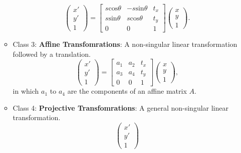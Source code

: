 \documentclass[twocolumn]{article}
\begin{document}
\begin{itemize}
\begin{itemize}
\begin{equation}
                \begin{pmatrix}
                    x' \\ y' \\ 1
                \end{pmatrix} =
                \begin{bmatrix}
                    s\text{cos} \theta  & - s\text{sin} \theta   & t_x \\
                    s\text{sin} \theta  & s\text{cos} \theta     & t_y \\
                    0                   & 0                     & 1
                \end{bmatrix}\begin{pmatrix}
                    x \\ y \\ 1
                \end{pmatrix}.
            \end{equation}
        \item Class 3: \textbf{Affine Transfomrations}: A non-singular linear transformation followed by a translation.
            \begin{equation}
                \begin{pmatrix}
                    x' \\ y' \\ 1
                \end{pmatrix} =
                \begin{bmatrix}
                     a_1 & a_2 & t_x \\
                     a_3 & a_4 & t_y \\
                     0                   & 0                     & 1
                \end{bmatrix}\begin{pmatrix}
                    x \\ y \\ 1
                \end{pmatrix},
            \end{equation} in which $a_1$ to $a_4$ are the components of an affine matrix $A$.
        \item Class 4: \textbf{Projective Transfomrations}: A general non-singular linear transformation.
            \begin{equation}
                \begin{pmatrix}
                    x' \\ y' \\ 1

\end{pmatrix}
\end{equation}
\end{itemize}
\end{itemize}
\end{document}
